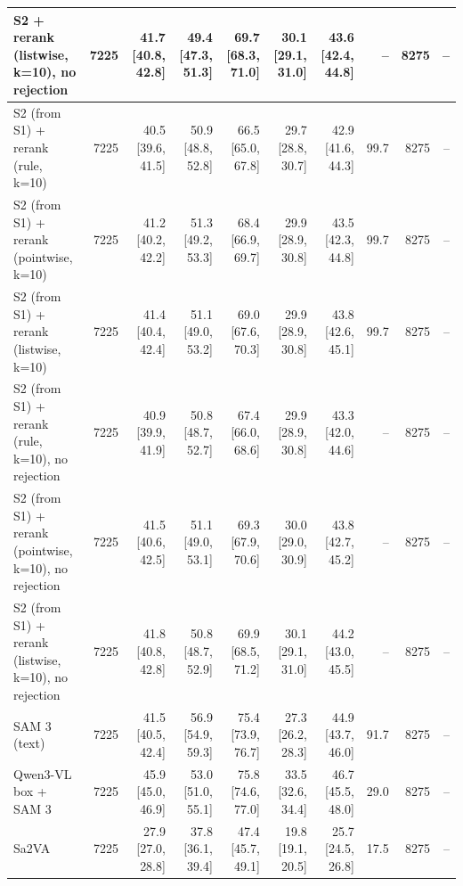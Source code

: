 \begin{tabular}{lrrrrrrrrr}
S2 + rerank (listwise, k=10), no rejection & 7225 & 41.7 \scriptsize{[40.8, 42.8]} & 49.4 \scriptsize{[47.3, 51.3]} & 69.7 \scriptsize{[68.3, 71.0]} & 30.1 \scriptsize{[29.1, 31.0]} & 43.6 \scriptsize{[42.4, 44.8]} & -- & 8275 & -- \\
\midrule
S2 (from S1) + rerank (rule, k=10) & 7225 & 40.5 \scriptsize{[39.6, 41.5]} & 50.9 \scriptsize{[48.8, 52.8]} & 66.5 \scriptsize{[65.0, 67.8]} & 29.7 \scriptsize{[28.8, 30.7]} & 42.9 \scriptsize{[41.6, 44.3]} & 99.7 & 8275 & -- \\
S2 (from S1) + rerank (pointwise, k=10) & 7225 & 41.2 \scriptsize{[40.2, 42.2]} & 51.3 \scriptsize{[49.2, 53.3]} & 68.4 \scriptsize{[66.9, 69.7]} & 29.9 \scriptsize{[28.9, 30.8]} & 43.5 \scriptsize{[42.3, 44.8]} & 99.7 & 8275 & -- \\
S2 (from S1) + rerank (listwise, k=10) & 7225 & 41.4 \scriptsize{[40.4, 42.4]} & 51.1 \scriptsize{[49.0, 53.2]} & 69.0 \scriptsize{[67.6, 70.3]} & 29.9 \scriptsize{[28.9, 30.8]} & 43.8 \scriptsize{[42.6, 45.1]} & 99.7 & 8275 & -- \\
\midrule
S2 (from S1) + rerank (rule, k=10), no rejection & 7225 & 40.9 \scriptsize{[39.9, 41.9]} & 50.8 \scriptsize{[48.7, 52.7]} & 67.4 \scriptsize{[66.0, 68.6]} & 29.9 \scriptsize{[28.9, 30.8]} & 43.3 \scriptsize{[42.0, 44.6]} & -- & 8275 & -- \\
S2 (from S1) + rerank (pointwise, k=10), no rejection & 7225 & 41.5 \scriptsize{[40.6, 42.5]} & 51.1 \scriptsize{[49.0, 53.1]} & 69.3 \scriptsize{[67.9, 70.6]} & 30.0 \scriptsize{[29.0, 30.9]} & 43.8 \scriptsize{[42.7, 45.2]} & -- & 8275 & -- \\
S2 (from S1) + rerank (listwise, k=10), no rejection & 7225 & 41.8 \scriptsize{[40.8, 42.8]} & 50.8 \scriptsize{[48.7, 52.9]} & 69.9 \scriptsize{[68.5, 71.2]} & 30.1 \scriptsize{[29.1, 31.0]} & 44.2 \scriptsize{[43.0, 45.5]} & -- & 8275 & -- \\
\midrule
SAM 3 (text) & 7225 & 41.5 \scriptsize{[40.5, 42.4]} & 56.9 \scriptsize{[54.9, 59.3]} & 75.4 \scriptsize{[73.9, 76.7]} & 27.3 \scriptsize{[26.2, 28.3]} & 44.9 \scriptsize{[43.7, 46.0]} & 91.7 & 8275 & -- \\
Qwen3-VL box + SAM 3 & 7225 & 45.9 \scriptsize{[45.0, 46.9]} & 53.0 \scriptsize{[51.0, 55.1]} & 75.8 \scriptsize{[74.6, 77.0]} & 33.5 \scriptsize{[32.6, 34.4]} & 46.7 \scriptsize{[45.5, 48.0]} & 29.0 & 8275 & -- \\
Sa2VA & 7225 & 27.9 \scriptsize{[27.0, 28.8]} & 37.8 \scriptsize{[36.1, 39.4]} & 47.4 \scriptsize{[45.7, 49.1]} & 19.8 \scriptsize{[19.1, 20.5]} & 25.7 \scriptsize{[24.5, 26.8]} & 17.5 & 8275 & -- \\
\bottomrule
\end{tabular}
